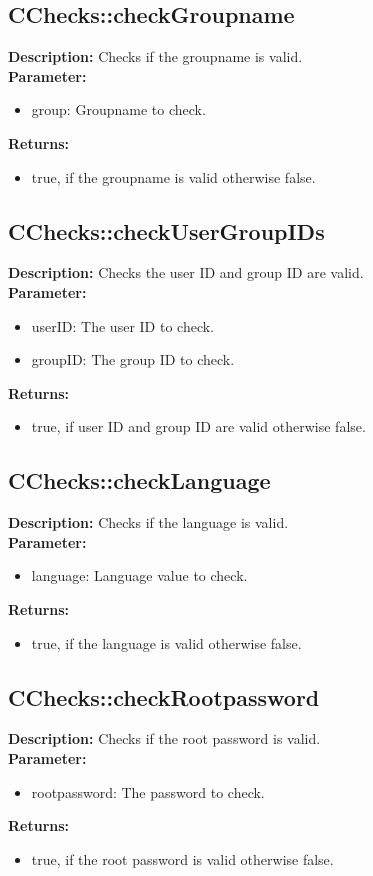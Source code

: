 \subsection{CChecks::checkGroupname}
\textbf{Description:} Checks if the groupname is valid.\\
\textbf{Parameter:}
\begin{itemize}
\item group: Groupname to check.
\end{itemize}
\textbf{Returns:}
\begin{itemize}
\item true, if the groupname is valid otherwise false.
\end{itemize}

\subsection{CChecks::checkUserGroupIDs}
\textbf{Description:} Checks the user ID and group ID are valid.\\
\textbf{Parameter:}
\begin{itemize}
\item userID: The user ID to check.
\item groupID: The group ID to check.
\end{itemize}
\textbf{Returns:}
\begin{itemize}
\item true, if user ID and group ID are valid otherwise false.
\end{itemize}

\subsection{CChecks::checkLanguage}
\textbf{Description:} Checks if the language is valid.\\
\textbf{Parameter:}
\begin{itemize}
\item language: Language value to check.
\end{itemize}
\textbf{Returns:}
\begin{itemize}
\item true, if the language is valid otherwise false.
\end{itemize}

\subsection{CChecks::checkRootpassword}
\textbf{Description:} Checks if the root password is valid.\\
\textbf{Parameter:}
\begin{itemize}
\item rootpassword: The password to check.
\end{itemize}
\textbf{Returns:}
\begin{itemize}
\item true, if the root password is valid otherwise false.
\end{itemize}

